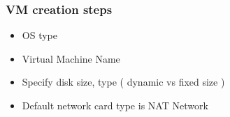 \begin{frame}
\frametitle{VM creation steps}
\begin{itemize}
    \item OS type
    \item Virtual Machine Name 
    \item 
Specify disk size, type ( dynamic vs fixed size )
    \item 
Default network card type is NAT Network
\end{itemize}
\end{frame}
